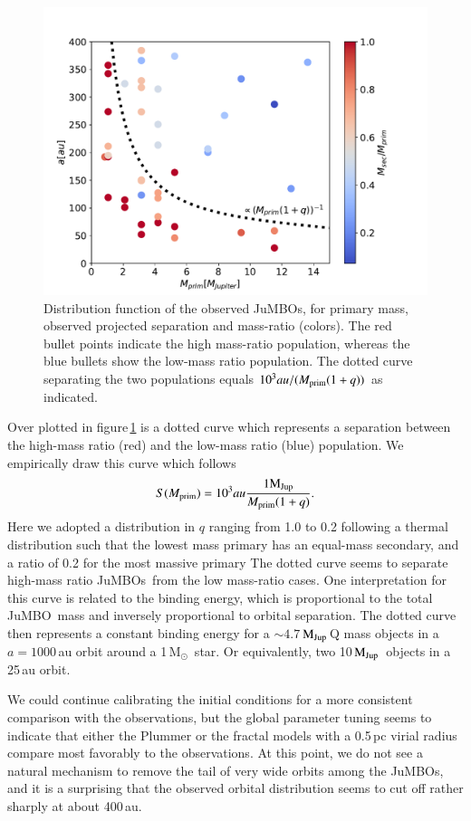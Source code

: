 \documentclass[submission,phys]{lib/SciPost}
\newcommand{\MSun}{\mbox{$\mathrm{{M}}_\odot$}}
\newcommand{\MJup}{\mbox{$\mathrm{{M}}_{\rm Jup}$}}
\newcommand{\jumbo}{\mbox{JuMBO}}
\newcommand{\jumbos}{\mbox{JuMBOs}}
\begin{document}
\begin{figure}
    \centering
    \includegraphics[width=0.75\columnwidth]{figures/fig_obs_mprim_vs_separation_in_q.pdf}
    \caption{Distribution function of the observed \jumbos, for
      primary mass, observed projected separation and mass-ratio
      (colors). The red bullet points indicate the high mass-ratio
      population, whereas the blue bullets show the low-mass ratio
      population.  The dotted curve separating the two populations
      equals $10^3au/(M_{\rm prim}(1+q))$ as indicated.
      }
    \label{Fig:obs_q_mprim_sep}
\end{figure}


Over plotted in figure\,\ref{Fig:obs_q_mprim_sep} is a dotted curve
which represents a separation between the high-mass ratio (red) and
the low-mass ratio (blue) population. We empirically draw this curve
which follows
\begin{equation}
  S(M_{\rm prim}) = 10^3 au {1 \MJup \over M_{\rm prim}(1+q)}.
\end{equation}
Here we adopted a distribution in $q$ ranging from 1.0 to 0.2
following a thermal distribution such that the lowest mass primary has
an equal-mass secondary, and a ratio of 0.2 for the most massive
primary The dotted curve seems to separate high-mass ratio \jumbos\,
from the low mass-ratio cases. One interpretation for this curve is
related to the binding energy, which is proportional to the total
\jumbo\, mass and inversely proportional to orbital separation.  The
dotted curve then represents a constant binding energy for a $\sim
4.7$\,\MJup\,Q mass objects in a $a=1000$\,au orbit around a
1\,\MSun\, star. Or equivalently, two 10\,\MJup\, objects in a 25\,au
orbit.

We could continue calibrating the initial conditions for a more
consistent comparison with the observations, but the global parameter
tuning seems to indicate that either the Plummer or the fractal models
with a 0.5\,pc virial radius compare most favorably to the
observations.  At this point, we do not see a natural mechanism to
remove the tail of very wide orbits among the \jumbos, and it is a 
surprising that the observed orbital distribution seems to cut off
rather sharply at about 400\,au.
\end{document}
